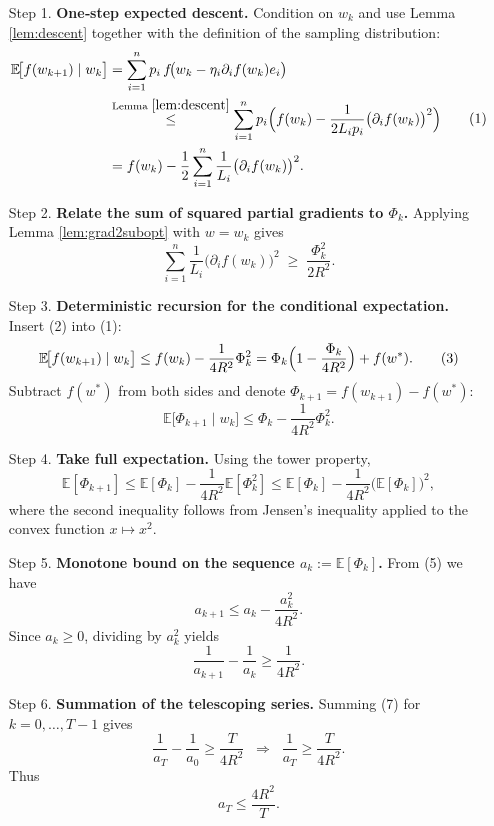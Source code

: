 \documentclass{article}
\newcommand{\E}{\mathbb{E}}
\begin{document}
\begin{enumerate}
\item[Step 1.] \textbf{One‑step expected descent.}  
Condition on $w_k$ and use Lemma \ref{lem:descent} together with the
definition of the sampling distribution:
\[
\begin{aligned}
\E\!\bigl[f(w_{k+1})\mid w_k\bigr]
&= \sum_{i=1}^{n}p_i\, f\!\bigl(w_k-\eta_i\partial_i f(w_k)e_i\bigr)\\
&\stackrel{\text{Lemma }\ref{lem:descent}}{\le}
\sum_{i=1}^{n}p_i\Bigl(f(w_k)-\frac{1}{2L_i p_i}\bigl(\partial_i f(w_k)\bigr)^{2}\Bigr)\\
&= f(w_k)-\frac12\sum_{i=1}^{n}\frac{1}{L_i}\bigl(\partial_i f(w_k)\bigr)^{2}.
\end{aligned}
\tag{1}
\]
\item[Step 2.] \textbf{Relate the sum of squared partial gradients to $\Phi_k$.}
Applying Lemma \ref{lem:grad2subopt} with $w=w_k$ gives
\[
\sum_{i=1}^{n}\frac{1}{L_i}\bigl(\partial_i f(w_k)\bigr)^{2}
\;\ge\;
\frac{\Phi_k^{2}}{2R^{2}}.
\tag{2}
\]
\item[Step 3.] \textbf{Deterministic recursion for the conditional expectation.}
Insert (2) into (1):
\[
\E\!\bigl[f(w_{k+1})\mid w_k\bigr]
\le f(w_k)-\frac{1}{4R^{2}}\Phi_k^{2}
= \Phi_k\Bigl(1-\frac{\Phi_k}{4R^{2}}\Bigr)+f(w^*).
\tag{3}
\]
Subtract $f(w^*)$ from both sides and denote $\Phi_{k+1}=f(w_{k+1})-f(w^*)$:
\[
\E\!\bigl[\Phi_{k+1}\mid w_k\bigr]\le \Phi_k-\frac{1}{4R^{2}}\Phi_k^{2}.
\tag{4}
\]

\item[Step 4.] \textbf{Take full expectation.}  Using the tower property,
\[
\E[\Phi_{k+1}]\le \E[\Phi_k]-\frac{1}{4R^{2}}\E[\Phi_k^{2}]
\le \E[\Phi_k]-\frac{1}{4R^{2}}\bigl(\E[\Phi_k]\bigr)^{2},
\tag{5}
\]
where the second inequality follows from Jensen’s inequality applied to the convex
function $x\mapsto x^{2}$.

\item[Step 5.] \textbf{Monotone bound on the sequence $a_k:=\E[\Phi_k]$.}  
From (5) we have
\[
a_{k+1}\le a_{k}-\frac{a_{k}^{2}}{4R^{2}}.
\tag{6}
\]
Since $a_k\ge0$, dividing by $a_k^{2}$ yields
\[
\frac{1}{a_{k+1}}-\frac{1}{a_{k}}
\ge \frac{1}{4R^{2}}.
\tag{7}
\]

\item[Step 6.] \textbf{Summation of the telescoping series.}  
Summing (7) for $k=0,\dots,T-1$ gives
\[
\frac{1}{a_{T}}-\frac{1}{a_{0}}\ge \frac{T}{4R^{2}}
\;\;\Longrightarrow\;\;
\frac{1}{a_{T}}\ge \frac{T}{4R^{2}}.
\tag{8}
\]
Thus
\[
a_{T}\le \frac{4R^{2}}{T}.
\tag{9}
\]


\end{enumerate}
\end{document}
